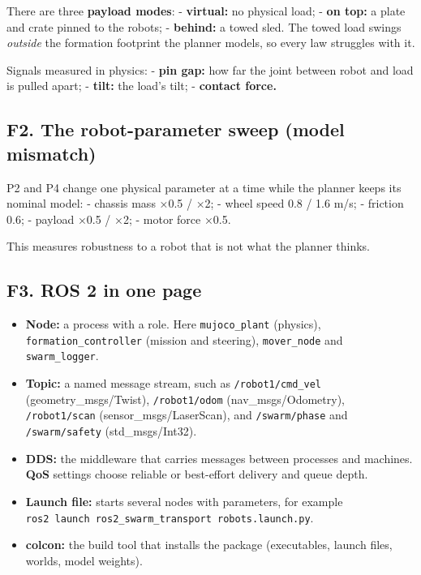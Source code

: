\documentclass[
  10.5pt,
  a4paper,
]{article}
\providecommand{\tightlist}{%
  \setlength{\itemsep}{0pt}\setlength{\parskip}{0pt}}
\begin{document}
There are three \textbf{payload modes}: - \textbf{virtual:} no physical
load; - \textbf{on top:} a plate and crate pinned to the robots; -
\textbf{behind:} a towed sled. The towed load swings \emph{outside} the
formation footprint the planner models, so every law struggles with it.

Signals measured in physics: - \textbf{pin gap:} how far the joint
between robot and load is pulled apart; - \textbf{tilt:} the load's
tilt; - \textbf{contact force.}

\hypertarget{f2.-the-robot-parameter-sweep-model-mismatch}{%
\subsection{F2. The robot-parameter sweep (model
mismatch)}\label{f2.-the-robot-parameter-sweep-model-mismatch}}

P2 and P4 change one physical parameter at a time while the planner
keeps its nominal model: - chassis mass ×0.5 / ×2; - wheel speed 0.8 /
1.6 m/s; - friction 0.6; - payload ×0.5 / ×2; - motor force ×0.5.

This measures robustness to a robot that is not what the planner thinks.

\hypertarget{f3.-ros-2-in-one-page}{%
\subsection{F3. ROS 2 in one page}\label{f3.-ros-2-in-one-page}}

\begin{itemize}
\tightlist
\item
  \textbf{Node:} a process with a role. Here \texttt{mujoco\_plant}
  (physics), \texttt{formation\_controller} (mission and steering),
  \texttt{mover\_node} and \texttt{swarm\_logger}.
\item
  \textbf{Topic:} a named message stream, such as
  \texttt{/robot1/cmd\_vel} (geometry\_msgs/Twist),
  \texttt{/robot1/odom} (nav\_msgs/Odometry), \texttt{/robot1/scan}
  (sensor\_msgs/LaserScan), and \texttt{/swarm/phase} and
  \texttt{/swarm/safety} (std\_msgs/Int32).
\item
  \textbf{DDS:} the middleware that carries messages between processes
  and machines. \textbf{QoS} settings choose reliable or best-effort
  delivery and queue depth.
\item
  \textbf{Launch file:} starts several nodes with parameters, for
  example
  \texttt{ros2\ launch\ ros2\_swarm\_transport\ robots.launch.py}.
\item
  \textbf{colcon:} the build tool that installs the package
  (executables, launch files, worlds, model weights).
\end{itemize}
\end{document}
